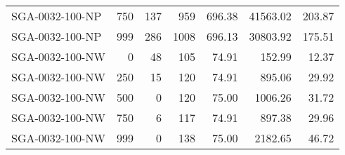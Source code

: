 \begin{table}[htbp]
{\begin{tabular}{lrrrrrr}
    SGA-0032-100-NP & 750    & 137    & 959    & 696.38 & 41563.02 & 203.87 \\
    SGA-0032-100-NP & 999    & 286    & 1008   & 696.13 & 30803.92 & 175.51 \\ \hline
    SGA-0032-100-NW & 0      & 48     & 105    & 74.91  & 152.99 & 12.37 \\
    SGA-0032-100-NW & 250    & 15     & 120    & 74.91  & 895.06 & 29.92 \\
    SGA-0032-100-NW & 500    & 0      & 120    & 75.00  & 1006.26 & 31.72 \\
    SGA-0032-100-NW & 750    & 6      & 117    & 74.91  & 897.38 & 29.96 \\
    SGA-0032-100-NW & 999    & 0      & 138    & 75.00  & 2182.65 & 46.72 \\
    \bottomrule
    \end{tabular}}
  \label{tab:addlabel}%
\end{table}%
